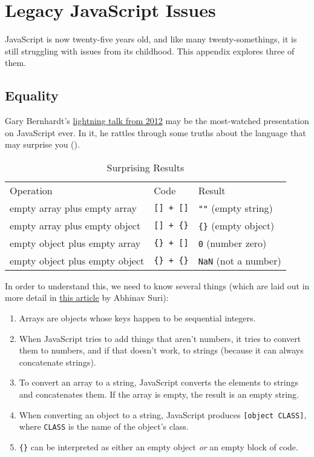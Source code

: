 \chapter{Legacy JavaScript Issues}\label{s:legacy}

JavaScript is now twenty-five years old,
and like many twenty-somethings,
it is still struggling with issues from its childhood.
This appendix explores three of them.

\section{Equality}\label{s:legacy-equality}

Gary Bernhardt's \href{https://www.destroyallsoftware.com/talks/wat}{lightning talk from 2012}
may be the most-watched presentation on JavaScript ever.
In it,
he rattles through some truths about the language that may surprise you
().


\begin{table}
\begin{longtable}{lll}
Operation & Code & Result\tabularnewline
empty array plus empty array & \texttt{{[}{]}\ +\ {[}{]}} & \texttt{""} (empty string)\tabularnewline
empty array plus empty object & \texttt{{[}{]}\ +\ \{\}} & \texttt{\{\}} (empty object)\tabularnewline
empty object plus empty array & \texttt{\{\}\ +\ {[}{]}} & \texttt{0} (number zero)\tabularnewline
empty object plus empty object & \texttt{\{\}\ +\ \{\}} & \texttt{NaN} (not a number)\tabularnewline
\end{longtable}
\caption{Surprising Results}
\label{t:legacy-surprises}
\end{table}

In order to understand this, we need to know several things
(which are laid out in more detail in \href{https://medium.com/dailyjs/the-why-behind-the-wat-an-explanation-of-javascripts-weird-type-system-83b92879a8db}{this article} by Abhinav Suri):

\begin{enumerate}
\item
  Arrays are objects whose keys happen to be sequential integers.
\item
  When JavaScript tries to add things that aren't numbers,
  it tries to convert them to numbers,
  and if that doesn't work,
  to strings (because it can always concatenate strings).
\item
  To convert an array to a string,
  JavaScript converts the elements to strings and concatenates them.
  If the array is empty, the result is an empty string.
\item
  When converting an object to a string,
  JavaScript produces \texttt{{[}object\ CLASS{]}},
  where \texttt{CLASS} is the name of the object's class.
\item
  \texttt{\{\}} can be interpreted as either an empty object \emph{or} an empty block of code.
\end{enumerate}

